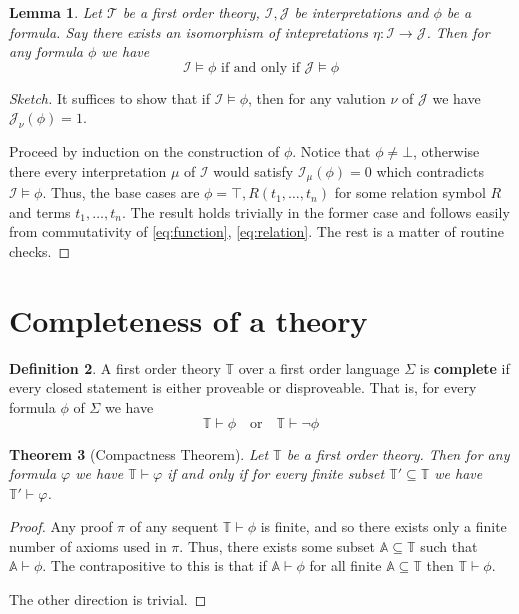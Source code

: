 \documentclass[12pt]{article}
\theoremstyle{plain}
\newtheorem{thm}{Theorem}[subsection] %
\newtheorem{lemma}[thm]{Lemma}
\theoremstyle{definition}
\newtheorem{defn}[thm]{Definition} %
\newcommand{\bb}[1]{\mathbb{#1}}
\newcommand{\call}[1]{\mathcal{#1}}
\newcommand{\lto}{\longrightarrow}
\begin{document}
	\begin{lemma}\label{lem:isomorphic_models}
		Let $\call{T}$ be a first order theory, $\call{I}, \call{J}$ be interpretations and $\phi$ be a formula. Say there exists an isomorphism of intepretations $\eta: \call{I} \lto \call{J}$. Then for any formula $\phi$ we have
		\begin{equation}
			\call{I} \models \phi \text{ if and only if }\call{J} \models \phi
			\end{equation}
		\end{lemma}
	\begin{proof}[Sketch]
		It suffices to show that if $\call{I} \models \phi$, then for any valution $\nu$ of $\call{J}$ we have $\call{J}_\nu(\phi) = 1$.
		
		Proceed by induction on the construction of $\phi$.  Notice that $\phi \neq \bot$, otherwise there every interpretation $\mu$ of $\call{I}$ would satisfy $\call{I}_\mu(\phi) = 0$ which contradicts $\call{I} \models \phi$. Thus, the base cases are $\phi = \top, R(t_1,\ldots, t_n)$ for some relation symbol $R$ and terms $t_1, \ldots, t_n$. The result holds trivially in the former case and follows easily from commutativity of \eqref{eq:function}, \eqref{eq:relation}. The rest is a matter of routine checks.
		\end{proof}
	
	
	
	\section{Completeness of a theory}
	
	\begin{defn}\label{def:completeness_theory}
		A first order theory $\bb{T}$ over a first order language $\Sigma$ is \textbf{complete} if every closed statement is either proveable or disproveable. That is, for every formula $\phi$ of $\Sigma$ we have
		\begin{equation}
			\bb{T} \vdash \phi \quad \text{or} \quad \bb{T} \vdash \neg \phi
			\end{equation}
		\end{defn}
	
	\begin{thm}[Compactness Theorem]\label{thm:compactness_theorem}
		Let $\bb{T}$ be a first order theory. Then for any formula $\varphi$ we have $\bb{T} \vdash \varphi$ if and only if for every finite subset $\bb{T}' \subseteq \bb{T}$ we have $\bb{T}' \vdash \varphi$.
		\end{thm}
	\begin{proof}
		Any proof $\pi$ of any sequent $\bb{T} \vdash \phi$ is finite, and so there exists only a finite number of axioms used in $\pi$. Thus, there exists some subset $\bb{A} \subseteq \bb{T}$ such that $\bb{A} \vdash \phi$. The contrapositive to this is that if $\bb{A} \vdash \phi$ for all finite $\bb{A} \subseteq \bb{T}$ then $\bb{T} \vdash \phi$.
		
		The other direction is trivial.
		\end{proof}
	
\end{document}
